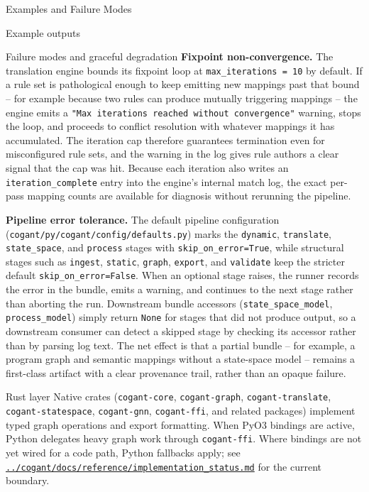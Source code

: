 \documentclass[
  ignorenonframetext,
]{beamer}
\begin{document}
\begin{frame}[fragile]{Examples and Failure Modes}
\begin{block}{Example outputs}
\begin{block}{Failure modes and graceful degradation}
\textbf{Fixpoint non-convergence.} The translation engine bounds its
fixpoint loop at \texttt{max\_iterations\ =\ 10} by default. If a rule
set is pathological enough to keep emitting new mappings past that bound
-- for example because two rules can produce mutually triggering
mappings -- the engine emits a
\texttt{"Max\ iterations\ reached\ without\ convergence"} warning, stops
the loop, and proceeds to conflict resolution with whatever mappings it
has accumulated. The iteration cap therefore guarantees termination even
for misconfigured rule sets, and the warning in the log gives rule
authors a clear signal that the cap was hit. Because each iteration also
writes an \texttt{iteration\_complete} entry into the engine's internal
match log, the exact per-pass mapping counts are available for diagnosis
without rerunning the pipeline.

\textbf{Pipeline error tolerance.} The default pipeline configuration
(\texttt{cogant/py/cogant/config/defaults.py}) marks the
\texttt{dynamic}, \texttt{translate}, \texttt{state\_space}, and
\texttt{process} stages with \texttt{skip\_on\_error=True}, while
structural stages such as \texttt{ingest}, \texttt{static},
\texttt{graph}, \texttt{export}, and \texttt{validate} keep the stricter
default \texttt{skip\_on\_error=False}. When an optional stage raises,
the runner records the error in the bundle, emits a warning, and
continues to the next stage rather than aborting the run. Downstream
bundle accessors (\texttt{state\_space\_model}, \texttt{process\_model})
simply return \texttt{None} for stages that did not produce output, so a
downstream consumer can detect a skipped stage by checking its accessor
rather than by parsing log text. The net effect is that a partial bundle
-- for example, a program graph and semantic mappings without a
state-space model -- remains a first-class artifact with a clear
provenance trail, rather than an opaque failure.
\end{block}
\end{block}

\begin{block}{Rust layer}
\protect{}\label{rust-layer}
Native crates (\texttt{cogant-core}, \texttt{cogant-graph},
\texttt{cogant-translate}, \texttt{cogant-statespace},
\texttt{cogant-gnn}, \texttt{cogant-ffi}, and related packages)
implement typed graph operations and export formatting. When PyO3
bindings are active, Python delegates heavy graph work through
\texttt{cogant-ffi}. Where bindings are not yet wired for a code path,
Python fallbacks apply; see
\href{../cogant/docs/reference/implementation_status.md}{\texttt{../cogant/docs/reference/implementation\_status.md}}
for the current boundary.
\end{block}
\end{frame}
\end{document}
